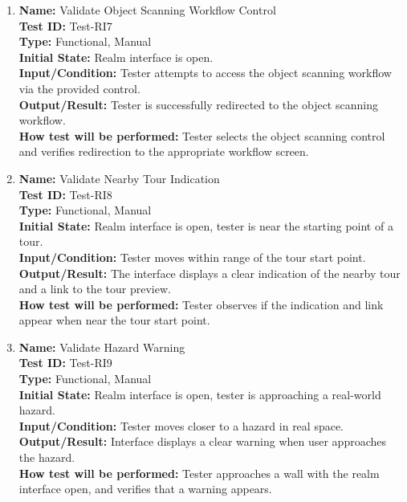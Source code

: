 \documentclass[12pt, titlepage]{article}
\begin{document}
\begin{enumerate}
\item \textbf{Name:} Validate Object Scanning Workflow Control \label{itm:Test-RI7} \\
\textbf{Test ID:} Test-RI7 \\
\textbf{Type:} Functional, Manual \\
\textbf{Initial State:} Realm interface is open. \\
\textbf{Input/Condition:} Tester attempts to access the object scanning workflow via the provided control. \\
\textbf{Output/Result:} Tester is successfully redirected to the object scanning workflow. \\
\textbf{How test will be performed:} Tester selects the object scanning control and verifies redirection to the appropriate workflow screen.


\item \textbf{Name:} Validate Nearby Tour Indication \label{itm:Test-RI8} \\
\textbf{Test ID:} Test-RI8 \\
\textbf{Type:} Functional, Manual \\
\textbf{Initial State:} Realm interface is open, tester is near the starting point of a tour. \\
\textbf{Input/Condition:} Tester moves within range of the tour start point. \\
\textbf{Output/Result:} The interface displays a clear indication of the nearby tour and a link to the tour preview. \\
\textbf{How test will be performed:} Tester observes if the indication and link appear when near the tour start point.

\item \textbf{Name:} Validate Hazard Warning \label{itm:Test-RI9} \\
\textbf{Test ID:} Test-RI9 \\
\textbf{Type:} Functional, Manual \\
\textbf{Initial State:} Realm interface is open, tester is approaching a real-world hazard. \\
\textbf{Input/Condition:} Tester moves closer to a hazard in real space. \\
\textbf{Output/Result:} Interface displays a clear warning when user approaches the hazard. \\
\textbf{How test will be performed:} Tester approaches a wall with the realm interface open, and verifies that a warning appears. 



\end{enumerate}
\end{document}
